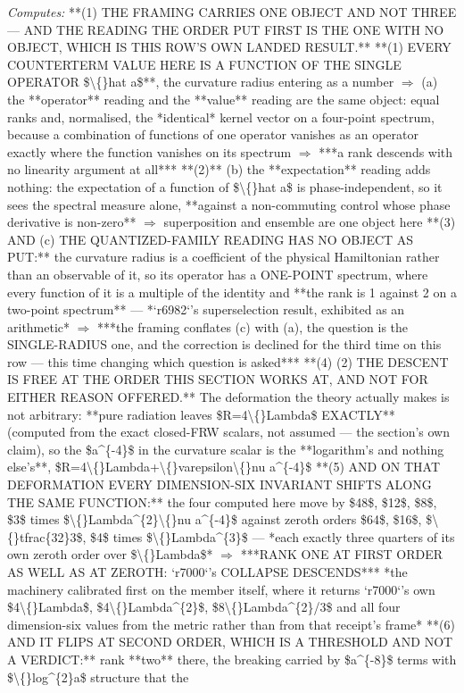 \begin{description}
\emph{Computes:} **(1) THE FRAMING CARRIES ONE OBJECT AND NOT THREE --- AND THE READING THE ORDER PUT FIRST IS THE ONE WITH NO OBJECT, WHICH IS THIS ROW'S OWN LANDED RESULT.**  **(1) EVERY COUNTERTERM VALUE HERE IS A FUNCTION OF THE SINGLE OPERATOR \$\textbackslash\{\}hat a\$**, the curvature radius entering as a number \ensuremath{\Rightarrow} (a) the **operator** reading and the **value** reading are the same object: equal ranks and, normalised, the *identical* kernel vector on a four-point spectrum, because a combination of functions of one operator vanishes as an operator exactly where the function vanishes on its spectrum \ensuremath{\Rightarrow} ***a rank descends with no linearity argument at all***  **(2)** (b) the **expectation** reading adds nothing: the expectation of a function of \$\textbackslash\{\}hat a\$ is phase-independent, so it sees the spectral measure alone, **against a non-commuting control whose phase derivative is non-zero** \ensuremath{\Rightarrow} superposition and ensemble are one object here  **(3)  AND (c) THE QUANTIZED-FAMILY READING HAS NO OBJECT AS PUT:** the curvature radius is a coefficient of the physical Hamiltonian rather than an observable of it, so its operator has a ONE-POINT spectrum, where every function of it is a multiple of the identity and **the rank is 1 against 2 on a two-point spectrum** --- *`r6982`'s superselection result, exhibited as an arithmetic* \ensuremath{\Rightarrow} ***the framing conflates (c) with (a), the question is the SINGLE-RADIUS one, and the correction is declined for the third time on this row --- this time changing which question is asked***  **(4)  (2) THE DESCENT IS FREE AT THE ORDER THIS SECTION WORKS AT, AND NOT FOR EITHER REASON OFFERED.** The deformation the theory actually makes is not arbitrary: **pure radiation leaves \$R=4\textbackslash\{\}Lambda\$ EXACTLY** (computed from the exact closed-FRW scalars, not assumed --- the section's own claim), so the \$a\textasciicircum{}\{-4\}\$ in the curvature scalar is the **logarithm's and nothing else's**, \$R=4\textbackslash\{\}Lambda+\textbackslash\{\}varepsilon\textbackslash\{\}nu a\textasciicircum{}\{-4\}\$  **(5) AND ON THAT DEFORMATION EVERY DIMENSION-SIX INVARIANT SHIFTS ALONG THE SAME FUNCTION:** the four computed here move by \$48\$, \$12\$, \$8\$, \$3\$ times \$\textbackslash\{\}Lambda\textasciicircum{}\{2\}\textbackslash\{\}nu a\textasciicircum{}\{-4\}\$ against zeroth orders \$64\$, \$16\$, \$\textbackslash\{\}tfrac\{32\}3\$, \$4\$ times \$\textbackslash\{\}Lambda\textasciicircum{}\{3\}\$ --- *each exactly three quarters of its own zeroth order over \$\textbackslash\{\}Lambda\$* \ensuremath{\Rightarrow} ***RANK ONE AT FIRST ORDER AS WELL AS AT ZEROTH: `r7000`'s COLLAPSE DESCENDS***  *the machinery calibrated first on the member itself, where it returns `r7000`'s own \$4\textbackslash\{\}Lambda\$, \$4\textbackslash\{\}Lambda\textasciicircum{}\{2\}\$, \$8\textbackslash\{\}Lambda\textasciicircum{}\{2\}/3\$ and all four dimension-six values from the metric rather than from that receipt's frame*  **(6)  AND IT FLIPS AT SECOND ORDER, WHICH IS A THRESHOLD AND NOT A VERDICT:** rank **two** there, the breaking carried by \$a\textasciicircum{}\{-8\}\$ terms with \$\textbackslash\{\}log\textasciicircum{}\{2\}a\$ structure that the 
\end{description}

